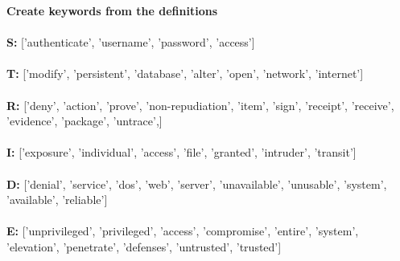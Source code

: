 \textbf{Create keywords from the definitions}\\\\
\textbf{S:} ['authenticate', 'username', 'password', 'access'] \\\\
\textbf{T:} ['modify', 'persistent', 'database', 'alter', 'open', 'network', 'internet'] \\\\ %
\textbf{R:} ['deny', 'action', 'prove', 'non-repudiation', 'item', 'sign', 'receipt', 'receive', 'evidence', 'package', 'untrace',] \\\\
\textbf{I:} ['exposure', 'individual', 'access', 'file', 'granted', 'intruder', 'transit'] \\\\
\textbf{D:} ['denial', 'service', 'dos', 'web', 'server', 'unavailable', 'unusable', 'system', 'available', 'reliable'] \\\\
\textbf{E:} ['unprivileged', 'privileged', 'access', 'compromise', 'entire', 'system', 'elevation', 'penetrate', 'defenses', 'untrusted', 'trusted'] \\\\


